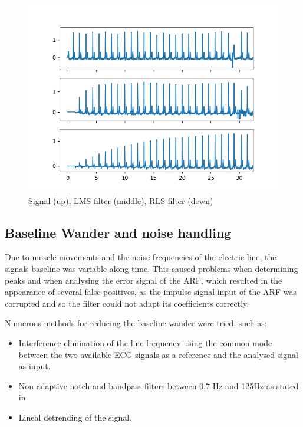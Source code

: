 \documentclass[conference]{IEEEtran}
\begin{document}
\begin{figure}[H]
\centerline{\includegraphics[scale=0.6]{imagenes/filter_comparison.png}}
\caption{Signal (up), LMS filter (middle), RLS filter (down)}
\label{fig}
\end{figure}

\subsection{Baseline Wander and noise handling}

Due to muscle movements and the noise frequencies of the electric line, the signals baseline was variable along time. This caused problems when determining peaks and when analysing the error signal of the ARF, which resulted in the appearance of several false positives, as the impulse signal input of the ARF was corrupted and so the filter could not adapt its coefficients correctly. \par
Numerous methods for reducing the baseline wander were tried, such as:
\begin{itemize}
\item Interference elimination of the line frequency using the common mode between the two available ECG signals as a reference and the analysed signal as input.
\item Non adaptive notch and bandpass filters between 0.7 Hz and 125Hz as stated in \cite{b2}
\item Lineal detrending of the signal.
\end{itemize}
\end{document}
